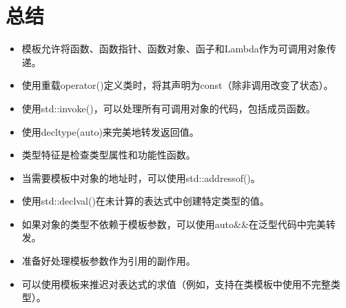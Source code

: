 \section{总结}

\begin{itemize}
\item 
模板允许将函数、函数指针、函数对象、函子和Lambda作为可调用对象传递。

\item 
使用重载operator()定义类时，将其声明为const（除非调用改变了状态）。

\item 
使用std::invoke()，可以处理所有可调用对象的代码，包括成员函数。

\item 
使用decltype(auto)来完美地转发返回值。

\item 
类型特征是检查类型属性和功能性函数。

\item 
当需要模板中对象的地址时，可以使用std::addressof()。

\item 
使用std::declval()在未计算的表达式中创建特定类型的值。

\item 
如果对象的类型不依赖于模板参数，可以使用auto\&\&在泛型代码中完美转发。

\item 
准备好处理模板参数作为引用的副作用。

\item 
可以使用模板来推迟对表达式的求值（例如，支持在类模板中使用不完整类型）。
\end{itemize}